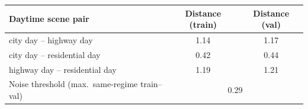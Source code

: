 \begin{tabular}{lcc}
\toprule
Daytime scene pair & Distance (train) & Distance (val) \\
\midrule
city day -- highway day & 1.14 & 1.17 \\
city day -- residential day & 0.42 & 0.44 \\
highway day -- residential day & 1.19 & 1.21 \\
\midrule
Noise threshold (max.\ same-regime train--val) & \multicolumn{2}{c}{0.29} \\
\bottomrule
\end{tabular}
